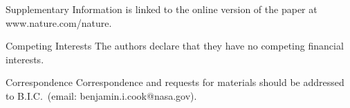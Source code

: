 \documentclass[final]{nature}
\begin{document}
\begin{addendum}
 \item [Supplementary Information] is linked to the online version of the paper at www.nature.com/nature.
 \item[Competing Interests] The authors declare that they have no
competing financial interests.
 \item[Correspondence] Correspondence and requests for materials
should be addressed to B.I.C.~(email: benjamin.i.cook@nasa.gov).
\end{addendum}
\end{document}
